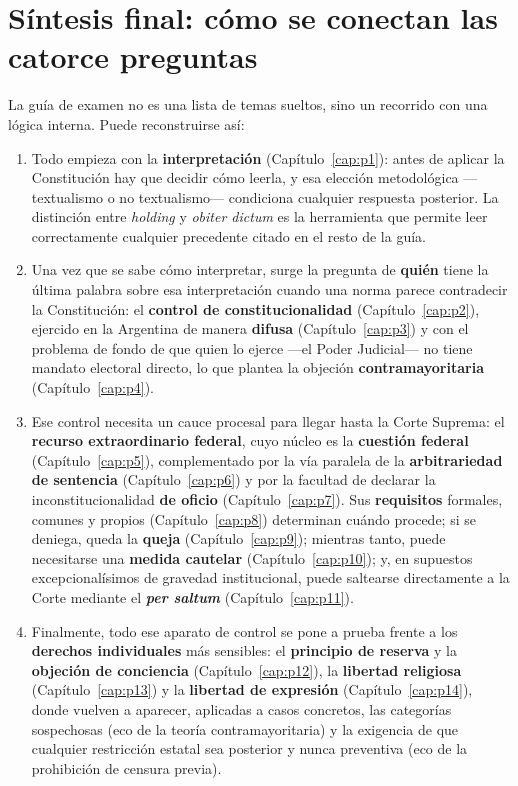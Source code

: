 \documentclass[12pt,oneside]{book}
\begin{document}
\chapter*{Síntesis final: cómo se conectan las catorce preguntas}

La guía de examen no es una lista de temas sueltos, sino un recorrido con una
lógica interna. Puede reconstruirse así:

\begin{enumerate}[leftmargin=1.6em]
  \item Todo empieza con la \textbf{interpretación} (Capítulo~\ref{cap:p1}):
  antes de aplicar la Constitución hay que decidir cómo leerla, y esa elección
  metodológica —textualismo o no textualismo— condiciona cualquier respuesta
  posterior. La distinción entre \textit{holding} y \textit{obiter dictum} es la
  herramienta que permite leer correctamente cualquier precedente citado en el
  resto de la guía.
  \item Una vez que se sabe cómo interpretar, surge la pregunta de \textbf{quién}
  tiene la última palabra sobre esa interpretación cuando una norma parece
  contradecir la Constitución: el \textbf{control de constitucionalidad}
  (Capítulo~\ref{cap:p2}), ejercido en la Argentina de manera \textbf{difusa}
  (Capítulo~\ref{cap:p3}) y con el problema de fondo de que quien lo ejerce —el
  Poder Judicial— no tiene mandato electoral directo, lo que plantea la objeción
  \textbf{contramayoritaria} (Capítulo~\ref{cap:p4}).
  \item Ese control necesita un cauce procesal para llegar hasta la Corte
  Suprema: el \textbf{recurso extraordinario federal}, cuyo núcleo es la
  \textbf{cuestión federal} (Capítulo~\ref{cap:p5}), complementado por la vía
  paralela de la \textbf{arbitrariedad de sentencia} (Capítulo~\ref{cap:p6}) y
  por la facultad de declarar la inconstitucionalidad \textbf{de oficio}
  (Capítulo~\ref{cap:p7}). Sus \textbf{requisitos} formales, comunes y propios
  (Capítulo~\ref{cap:p8}) determinan cuándo procede; si se deniega, queda la
  \textbf{queja} (Capítulo~\ref{cap:p9}); mientras tanto, puede necesitarse una
  \textbf{medida cautelar} (Capítulo~\ref{cap:p10}); y, en supuestos
  excepcionalísimos de gravedad institucional, puede saltearse directamente a la
  Corte mediante el \textit{\textbf{per saltum}} (Capítulo~\ref{cap:p11}).
  \item Finalmente, todo ese aparato de control se pone a prueba frente a los
  \textbf{derechos individuales} más sensibles: el \textbf{principio de reserva}
  y la \textbf{objeción de conciencia} (Capítulo~\ref{cap:p12}), la
  \textbf{libertad religiosa} (Capítulo~\ref{cap:p13}) y la \textbf{libertad de
  expresión} (Capítulo~\ref{cap:p14}), donde vuelven a aparecer, aplicadas a
  casos concretos, las categorías sospechosas (eco de la teoría contramayoritaria)
  y la exigencia de que cualquier restricción estatal sea posterior y nunca
  preventiva (eco de la prohibición de censura previa).
\end{enumerate}
\end{document}
